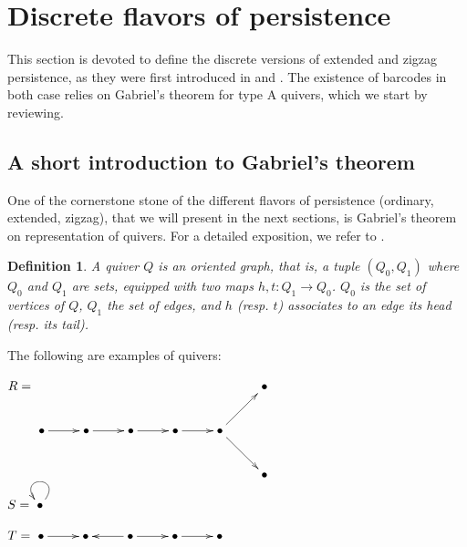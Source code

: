 \documentclass[11pt]{article}
\newtheorem{definition}[theorem]{Definition}
\theoremstyle{remark}
\begin{document}
\section{Discrete flavors of  persistence}

This section is devoted to define the discrete versions of extended and zigzag persistence, as they were first introduced in \cite{carlsson2008zigzag} and \cite{article}. The existence of barcodes in both case relies on Gabriel's theorem for type A quivers, which we start by reviewing. 

\subsection{A short introduction to Gabriel's theorem}

One of the cornerstone stone of the different flavors of persistence (ordinary, extended, zigzag), that we will present in the next sections, is Gabriel's theorem on representation of quivers. For a detailed exposition, we refer to \cite[Appendix A]{oudot:hal-01247501}.




\begin{definition} A quiver $Q$ is an oriented graph, that is, a tuple $(Q_0,Q_1)$ where $Q_0$ and $Q_1$ are sets, equipped with two maps $h,t : Q_1 \longrightarrow Q_0$. $Q_0$ is the set of \emph{vertices} of $Q$, $Q_1$ the set of \emph{edges}, and $h$ (resp. $t$) associates to an edge its \emph{head} (resp. its \emph{tail}).
\end{definition} 



The following are examples of quivers:

\bigskip


\begin{center}
     $R = \xymatrix{ &   &  &  & &\bullet \\
    \bullet \ar[r] & \bullet \ar[r] & \bullet \ar[r] & \bullet \ar[r] & \bullet \ar[rd] \ar[ru] \\ 
     &   &  &  & &\bullet}$
     
     \bigskip

  $S = \xymatrix{\bullet \ar@(ur,ul)}$
  
  \bigskip
    
    $T = \xymatrix{
    \bullet \ar[r] & \bullet & \bullet \ar[l] \ar[r] & \bullet \ar[r] & \bullet }$
    
     
\end{center}
\end{document}
